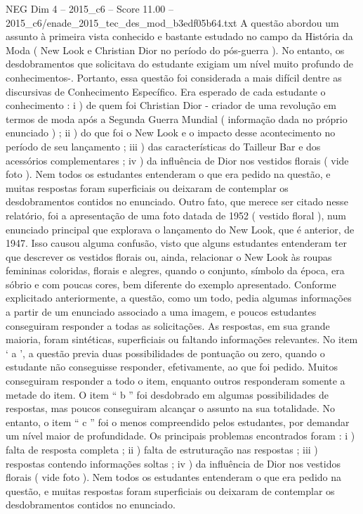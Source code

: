 \begin{textsample}{NEG Dim 4 – 2015\_c6 – Score 11.00 – 2015\_c6/enade\_2015\_tec\_des\_mod\_b3edf05b64.txt}
A questão abordou um assunto à primeira vista conhecido e bastante estudado no campo da História da Moda ( New Look e Christian Dior no período do pós-guerra ).
No entanto, os desdobramentos que solicitava do estudante exigiam um nível muito profundo de conhecimentos-.
Portanto, essa questão foi considerada a mais difícil dentre as discursivas de Conhecimento Específico.
Era esperado de cada estudante o conhecimento : i ) de quem foi Christian Dior - criador de uma revolução em termos de moda após a Segunda Guerra Mundial ( informação dada no próprio enunciado ) ; ii ) do que foi o New Look e o impacto desse acontecimento no período de seu lançamento ; iii ) das características do Tailleur Bar e dos acessórios complementares ; iv ) da influência de Dior nos vestidos florais ( vide foto ).
Nem todos os estudantes entenderam o que era pedido na questão, e muitas respostas foram superficiais ou deixaram de contemplar os desdobramentos contidos no enunciado.
Outro fato, que merece ser citado nesse relatório, foi a apresentação de uma foto datada de 1952 ( vestido floral ), num enunciado principal que explorava o lançamento do New Look, que é anterior, de 1947.
Isso causou alguma confusão, visto que alguns estudantes entenderam ter que descrever os vestidos florais ou, ainda, relacionar o New Look às roupas femininas coloridas, florais e alegres, quando o conjunto, símbolo da época, era sóbrio e com poucas cores, bem diferente do exemplo apresentado.
Conforme explicitado anteriormente, a questão, como um todo, pedia algumas informações a partir de um enunciado associado a uma imagem, e poucos estudantes conseguiram responder a todas as solicitações.
As respostas, em sua grande maioria, foram sintéticas, superficiais ou faltando informações relevantes.
No item ‘ a ’, a questão previa duas possibilidades de pontuação ou zero, quando o estudante não conseguisse responder, efetivamente, ao que foi pedido.
Muitos conseguiram responder a todo o item, enquanto outros responderam somente a metade do item.
O item “ b ” foi desdobrado em algumas possibilidades de respostas, mas poucos conseguiram alcançar o assunto na sua totalidade.
No entanto, o item “ c ” foi o menos compreendido pelos estudantes, por demandar um nível maior de profundidade.
Os principais problemas encontrados foram : i ) falta de resposta completa ; ii ) falta de estruturação nas respostas ; iii ) respostas contendo informações soltas ; iv ) da influência de Dior nos vestidos florais ( vide foto ).
Nem todos os estudantes entenderam o que era pedido na questão, e muitas respostas foram superficiais ou deixaram de contemplar os desdobramentos contidos no enunciado.

\end{textsample}
